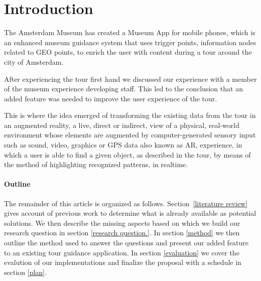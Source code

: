 \documentclass[12pt ,twocolumn]{article}
\begin{document}
\maketitle

\section{Introduction}
The Amsterdam Museum has created a  Museum App for mobile phones,  which is an enhanced museum guidance system that uses trigger points, information nodes related to GEO points, to enrich the user with content during a tour around the city of Amsterdam. 

After experiencing the tour first hand we discussed our experience with a member of the museum experience developing staff. This led to the conclusion that an added feature was needed to improve the user experience of the tour. 

This is where the idea emerged of transforming the existing data from the tour in an augmented reality, a live, direct or indirect, view of a physical, real-world environment whose elements are augmented by computer-generated sensory input such as sound, video, graphics or GPS data also known as AR, experience, in which a user is able to find a given object, as described in the tour, by means of the method of highlighting recognized patterns, in realtime.

\paragraph{Outline}
The remainder of this article is organized as follows.
Section~\ref{literature review} gives account of previous work to determine what is already available as potential solutions. We then describe the missing aspects based on which we build our research question in section \ref{research question.}. In section \ref{method} we then outline the method used to answer the questions and present our added feature to an existing tour guidance application.  In section \ref{evaluation} we cover the evalution of our implementations and  finalize the proposal with a schedule in section \ref{plan}.
\end{document}
